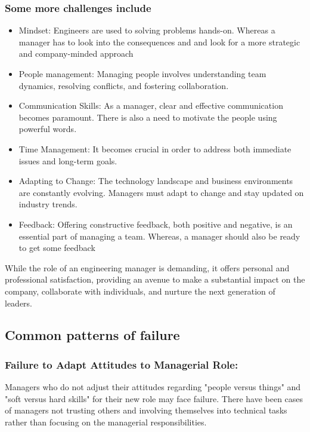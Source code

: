 \documentclass[runningheads]{article}
\begin{document}
\subsubsection{Some more challenges include}
\begin{itemize}
    \item Mindset: Engineers are used to solving problems hands-on. Whereas a manager has to look into the consequences and and look for a more strategic and company-minded approach
    \item People management: Managing people involves understanding team dynamics, resolving conflicts, and fostering collaboration.
    \item Communication Skills: As a manager, clear and effective communication becomes paramount. There is also a need to motivate the people using powerful words.
    \item Time Management: It becomes crucial in order to address both immediate issues and long-term goals.
    \item Adapting to Change: The technology landscape and business environments are constantly evolving. Managers must adapt to change and stay updated on industry trends.
    \item Feedback: Offering constructive feedback, both positive and negative, is an essential part of managing a team. Whereas, a manager should also be ready to get some feedback 
\end{itemize}

While the role of an engineering manager is demanding, it offers personal and professional satisfaction, providing an avenue to make a substantial impact on the company, collaborate with individuals, and nurture the next generation of leaders.

\subsection{Common patterns of failure}

\subsubsection{Failure to Adapt Attitudes to Managerial Role: \\}
Managers who do not adjust their attitudes regarding "people versus things" and "soft versus hard skills" for their new role may face failure. There have been cases of managers not trusting others and involving themselves into technical tasks rather than focusing on the managerial responsibilities.
\end{document}
